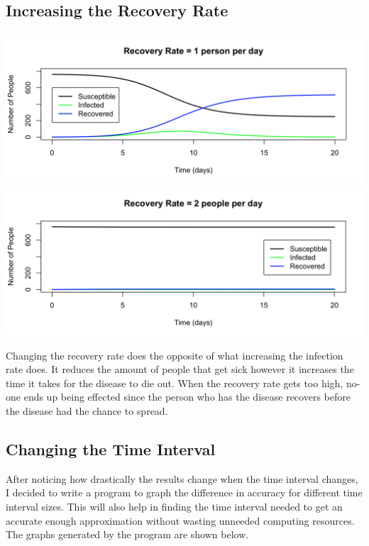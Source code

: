 \documentclass{article}
\begin{document}
    \subsection{Increasing the Recovery Rate}
        \includegraphics[width=\textwidth,height=\textheight,keepaspectratio]{sir_recovery_1.png}
        \includegraphics[width=\textwidth,height=\textheight,keepaspectratio]{sir_recovery_2.png}

        Changing the recovery rate does the opposite of what increasing the infection rate does. It reduces the amount of people that get sick however it increases the time it takes for the disease to die out. When the recovery rate gets too high, no-one ends up being effected since the person who has the disease recovers before the disease had the chance to spread.

    \subsection{Changing the Time Interval}
        After noticing how drastically the results change when the time interval changes, I decided to write a program to graph the difference in accuracy for different time interval sizes. This will also help in finding the time interval needed to get an accurate enough approximation without wasting unneeded computing resources. The graphs generated by the program are shown below.
\end{document}
